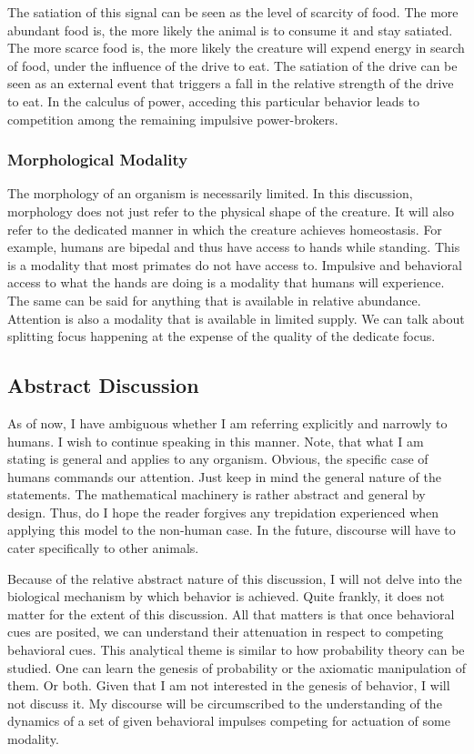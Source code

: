 \documentclass[12pt]{article}
\begin{document}
The satiation of this signal can be seen as the level of scarcity of food.
The more abundant food is, the more likely the animal is to consume it and stay satiated.
The more scarce food is, the more likely the creature will expend energy in search of food, under the influence of the drive to eat.
The satiation of the drive can be seen as an external event that triggers a fall in the relative strength of the drive to eat.
In the calculus of power, acceding this particular behavior leads to competition among the remaining impulsive power-brokers.

\subsubsection{Morphological Modality}
The morphology of an organism is necessarily limited.
In this discussion, morphology does not just refer to the physical shape of the creature.
It will also refer to the dedicated manner in which the creature achieves homeostasis.
For example, humans are bipedal and thus have access to hands while standing.
This is a modality that most primates do not have access to.
Impulsive and behavioral access to what the hands are doing is a modality that humans will experience.
The same can be said for anything that is available in relative abundance.
Attention is also a modality that is available in limited supply.
We can talk about splitting focus happening at the expense of the quality of the dedicate focus.

\subsection{Abstract Discussion}
As of now, I have ambiguous whether I am referring explicitly and narrowly to humans.
I wish to continue speaking in this manner.
Note, that what I am stating is general and applies to any organism.
Obvious, the specific case of humans commands our attention.
Just keep in mind the general nature of the statements.
The mathematical machinery is rather abstract and general by design.
Thus, do I hope the reader forgives any trepidation experienced when applying this model to the non-human case.
In the future, discourse will have to cater specifically to other animals.

Because of the relative abstract nature of this discussion, I will not delve into the biological mechanism by which behavior is achieved.
Quite frankly, it does not matter for the extent of this discussion.
All that matters is that once behavioral cues are posited, we can understand their attenuation in respect to competing behavioral cues.
This analytical theme is similar to how probability theory can be studied.
One can learn the genesis of probability or the axiomatic manipulation of them.
Or both.
Given that I am not interested in the genesis of behavior, I will not discuss it.
My discourse will be circumscribed to the understanding of the dynamics of a set of given behavioral impulses competing for actuation of some modality.
\end{document}
